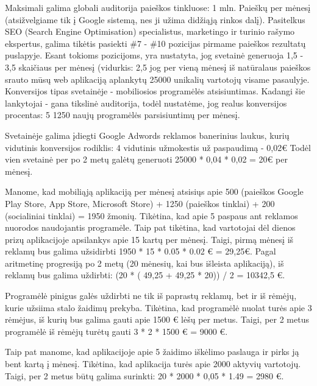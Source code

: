 \documentclass{VUMIFPSkursinis}
\begin{document}
		Maksimali galima globali auditorija paieškos tinkluose: 1 mln. Paieškų per 
		mėnesį (atsižvelgiame tik į Google sistemą, nes ji užima didžiąją rinkos 
		dalį). Pasitelkus SEO (Search Engine Optimisation) specialistus, marketingo 
		ir turinio rašymo ekspertus, galima tikėtis pasiekti \#7 - \#10 pozicijas 
		pirmame paieškos rezultatų puslapyje. Esant tokioms pozicijoms, yra 
		nustatyta, jog svetainė generuoja 1,5 - 3,5%
		skaičiaus per mėnesį (vidurkis: 2,5%
		jog per vieną mėnesį iš natūralaus paieškos srauto mūsų web aplikaciją 
		aplankytų 25000 unikalių vartotojų visame pasaulyje. Konversijos tipas 
		svetainėje - mobiliosios programėlės atsisiuntimas. Kadangi šie lankytojai 
		- gana tikslinė auditorija, todėl nustatėme, jog realus konversijos 
		procentas: 5%
		1250 naujų programėlės parsisiuntimų per mėnesį.

		Svetainėje galima įdiegti Google Adwords reklamos banerinius laukus, 
		kurių vidutinis konversijos rodiklis: 4%
		vidutinis užmokestis už paspaudimą - 0,02€
		Todėl vien svetainė per po 2 metų galėtų generuoti 25000 * 0,04 * 
		0,02 = 20€ per mėnesį.

		Manome, kad mobiliąją aplikaciją per mėnesį atsisiųs apie 500 (paieškos 
		Google Play Store, App Store, Microsoft Store) + 1250 (paieškos tinklai) 
		+ 200 (socialiniai tinklai) = 1950 žmonių. Tikėtina, kad apie 5%
		paspaus ant reklamos nuorodos naudojantis programėle. Taip pat tikėtina, 
		kad vartotojai dėl dienos prizų aplikacijoje apsilankys apie 15 kartų per 
		mėnesį. Taigi, pirmą mėnesį iš reklamų bus galima užsidirbti 1950 * 15 * 
		0.05 * 0.02 € = 29,25€. Pagal aritmetinę progresiją po 2 metų (20 mėnesių, 
		kai bus išleista aplikaciją), iš reklamų bus galima uždirbti: (20 * ( 49,25 
		+ 49,25 * 20)) / 2 = 10342,5 €.

		Programėlė pinigus galės uždirbti ne tik iš paprastų reklamų, bet ir 
		iš rėmėjų, kurie užsiima stalo žaidimų prekyba. Tikėtina, kad programėlė 
		nuolat turės apie 3 rėmėjus, iš kurių bus galima gauti apie 1500 € lėšų 
		per metus. Taigi, per 2 metus programėlė iš rėmėjų turėtų gauti 3 * 2 * 
		1500 € = 9000 €.

		Taip pat manome, kad aplikacijoje apie 5%
		žaidimo iškėlimo paslauga ir pirks ją bent kartą į mėnesį. Tikėtina, kad 
		aplikacija turės apie 2000 aktyvių vartotojų. Taigi, per 2 metus būtų 
		galima surinkti: 20 * 2000 * 0,05 * 1.49 = 2980 €.
\end{document}
